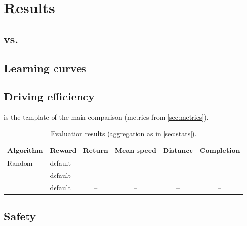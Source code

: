 \section{Results}\label{sec:results}

%

\subsection{\ddqn{} vs.\ \ppo{}}\label{sec:res-ddqn-ppo}

\subsection{Learning curves}\label{sec:res-curves}

\subsection{Driving efficiency}\label{sec:res-efficiency}
 is the template of the main comparison (metrics from \cref{sec:metrics}).
\begin{table}[H]
  \centering
  \caption{Evaluation results (aggregation as in \cref{sec:stats}).}
  \label{tab:main-results}
  \begin{tabular}{@{}llcccc@{}}
    \toprule
    Algorithm & Reward & Return & Mean speed & Distance & Completion \\
    \midrule
    Random  & default & -- & -- & -- & -- \\
    \ddqn{} & default & -- & -- & -- & -- \\
    \ppo{}  & default & -- & -- & -- & -- \\
    \bottomrule
  \end{tabular}
\end{table}

\subsection{Safety}\label{sec:res-safety}

